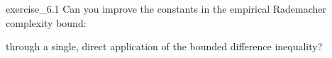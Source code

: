 \begin{exercise}{}{exercise_6.1}
    Can you improve the constants in the empirical Rademacher complexity bound:
    
    \noindent through a single, direct application of the bounded diﬀerence inequality?
\end{exercise}


